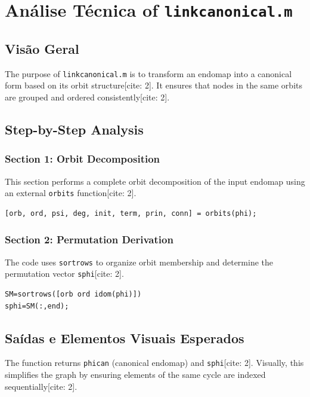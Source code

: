 
\chapter{Análise Técnica of \texttt{linkcanonical.m}}
\date{March 10, 2026}

\section{Visão Geral}
The purpose of \texttt{linkcanonical.m} is to transform an endomap into a canonical form based on its orbit structure[cite: 2]. It ensures that nodes in the same orbits are grouped and ordered consistently[cite: 2].

\section{Step-by-Step Analysis}

\subsection{Section 1: Orbit Decomposition}
This section performs a complete orbit decomposition of the input endomap using an external \texttt{orbits} function[cite: 2].
\begin{lstlisting}
[orb, ord, psi, deg, init, term, prin, conn] = orbits(phi);
\end{lstlisting}

\subsection{Section 2: Permutation Derivation}
The code uses \texttt{sortrows} to organize orbit membership and determine the permutation vector \texttt{sphi}[cite: 2].
\begin{lstlisting}
SM=sortrows([orb ord idom(phi)])
sphi=SM(:,end); 
\end{lstlisting}

\section{Saídas e Elementos Visuais Esperados}
The function returns \texttt{phican} (canonical endomap) and \texttt{sphi}[cite: 2]. Visually, this simplifies the graph by ensuring elements of the same cycle are indexed sequentially[cite: 2].
